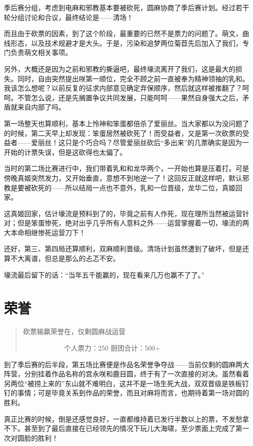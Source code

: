 季后赛分组，考虑到电麻和邪教基本要被砍死，圆麻协商了季后赛计划。经过若干轮分组讨论和合议，最终结论是——清场！

而且由于砍票的因素，到了这个阶段，最重要的已然不是票力的问题了。萌文，曲线形态，以及技术规避才是大头。于是，污染和追梦两位菊苣先后加入了我们，专门负责萌文相关事项。

另外，大概还是因为之前和邪教的撕逼吧，最终壕流离开了我们，这是最大的损失。同时，自由突然提出咲第一顺位，完全不顾之前一直被奉为精神领袖的乳和。我该怎么想呢？以前反复的征求内部意见确定弃保顺序，然后就这样被推翻了？呵呵。不管怎么说，还是先搁置争议共同发展，只能呵呵——果然自身强大之后，矛盾就来自内部了吗。

第一场整天也算顺利，基本上怜神和笨蛋都倍杀了爱丽丝。当大家都以为没问题了的时候，第二天早上却发现：笨蛋居然被砍死了！而受益者，又是第一次砍票的受益者——爱丽丝！这只是个巧合吗？尽管爱丽丝砍后“多出来”的几票确实是因为一开始的计票失误，但是这砍得也太偏了。

当时的第二场比赛进行中，我们带着乳和和龙华两个，一开始也算是压着打。可是傍晚真姬突然发力，又开始垂直，意想不到地逆一了！这回反正就这样吧，默认邪教是要被砍死的——所以结局一点也不意外，乳和一位晋级，龙华二位，真姬回家。

这真姬回家，估计壕流是预料到了的，毕竟之前有人作死，现在理所当然被运营针对；但是笨蛋惨死，绝对出乎几乎所有人意料之外——运营掌握着一切，壕流的两大本命相继惨死运营刀下！

还好，第三、第四局还算顺利，双麻顺利晋级。清场计划虽然遭到了破坏，但是还算不大离谱，但总是那么的忐忑不安。

壕流最后留下的话：“当年五千能赢的，现在看来几万也赢不了了。”


\chapter{荣誉}
\begin{quote}
砍票输赢荣誉在，仅剩圆麻战运营

　　　　　　个人票力：250 厨团合计：500+
\end{quote}

到了季后赛的后半段，第五场比赛便是作品名荣誉争夺战——当前仅剩的圆麻两大阵营，分别挂着作品名称的宫永咲和鹿目圆，终于有了一次直接的对决。虽然看着另两位“被捞上来的”东山就不难明白，这并不是一场生死大战，双双晋级是铁板钉钉的事情；可是毕竟关系到作品的荣誉，而且对麻将而言，也期待着第一场对圆的胜利。

真正比赛的时候，倒是还感觉良好，一直都维持着已发行半数以上的票，不发愁拿不下。甚至到了最后直接在已经领先的情况下玩儿大海啸，至少票面上完成了第一次对圆脸的胜利！

